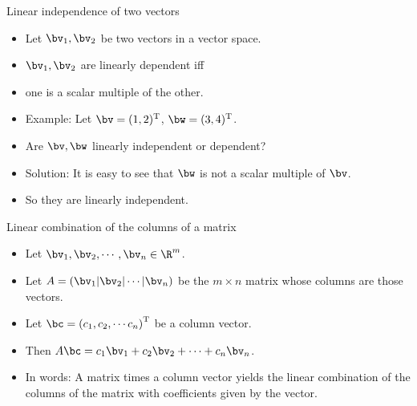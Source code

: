 \documentclass{beamer}
\begin{document}
\begin{frame}{Linear independence of two vectors}

\begin{itemize}
\item Let $\bv_1,\bv_2$ be two vectors in a vector space.
\item $\bv_1,\bv_2$ are linearly dependent iff
\item one is a scalar multiple of the other.
\item Example: Let $\bv=(1,2)^{\text{T}}$, $\bw=(3,4)^{\text{T}}$.
\item Are $\bv,\bw$ linearly independent or dependent?
\item Solution: It is easy to see that $\bw$ is not a scalar multiple of $\bv$.
\item So they are linearly independent.
\end{itemize}

\end{frame}

\begin{frame}{Linear combination of the columns of a matrix}

\begin{itemize}
\item Let $\bv_1,\bv_2,\cdots,\bv_n \in \R^m$.
\item Let $A =\left( \bv_1 \vert \bv_2 \vert \cdots \vert \bv_n \right)$
be the $m\times n$ matrix whose columns are those vectors.
\item Let $\bc = \left(c_1, c_2,\cdots c_n\right)^{\text{T}}$ be a column vector.
\item Then $A\bc = c_1\bv_1 + c_2\bv_2 + \cdots + c_n\bv_n$.
\item In words: A matrix times a column vector yields the linear
combination of the columns of the matrix with coefficients given by
the vector.
\end{itemize}

\end{frame}

\end{document}
